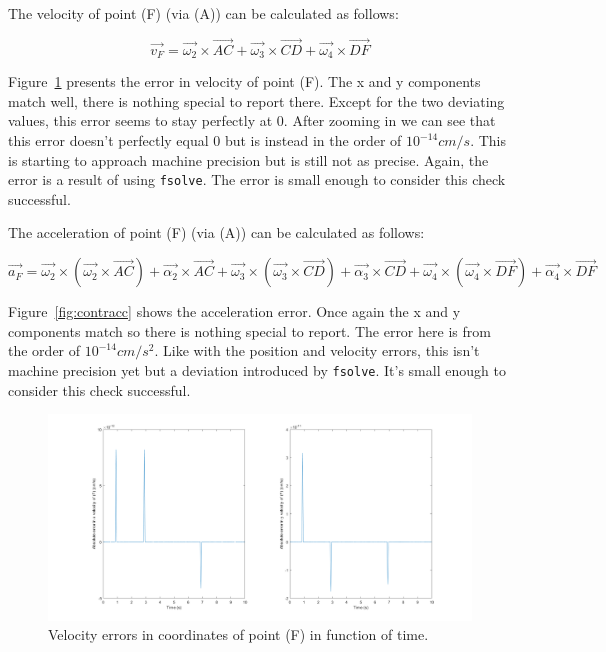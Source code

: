 \documentclass[a4paper]{article}
\begin{document}
The velocity of point (F) (via (A)) can be calculated as follows:

\begin{equation}
	\vec{v_F} = \vec{\omega_2}\times\vec{AC}+ \vec{\omega_3}\times\vec{CD}+ \vec{\omega_4}\times\vec{DF}
\end{equation}

Figure~\ref{fig:contrvel} presents the error in velocity of point (F). The x and y components match well, there is nothing special to report there. Except for the two deviating values, this error seems to stay perfectly at 0. After zooming in we can see that this error doesn’t perfectly equal 0 but is instead in the order of \(10^{-14} \si{cm/s}\). This is starting to approach machine precision but is still not as precise. Again, the error is a result of using \texttt{fsolve}. The error is small enough to consider this check successful.

The acceleration of point (F) (via (A)) can be calculated as follows:

\begin{equation}
	\vec{a_F} = \vec{\omega_2}\times(\vec{\omega_2}\times\vec{AC}) + \vec{\alpha_2}\times\vec{AC} + \vec{\omega_3}\times(\vec{\omega_3}\times\vec{CD}) + \vec{\alpha_3}\times\vec{CD} + \vec{\omega_4}\times(\vec{\omega_4}\times\vec{DF}) + \vec{\alpha_4}\times\vec{DF}
\end{equation}

Figure~\ref{fig:contracc} shows the acceleration error. Once again the x and y components match so there is nothing special to report. The error here is from the order of \(10^{-14} \si{cm/s^2}\). Like with the position and velocity errors, this isn’t machine precision yet but a deviation introduced by \texttt{fsolve}. It’s small enough to consider this check successful.

\begin{figure}
	\centering
	
	\includegraphics[width = \textwidth]{contrvel.png}
	
	\caption{Velocity errors in coordinates of point (F) in function of time.}
	\label{fig:contrvel}
	
\end{figure}
\end{document}
